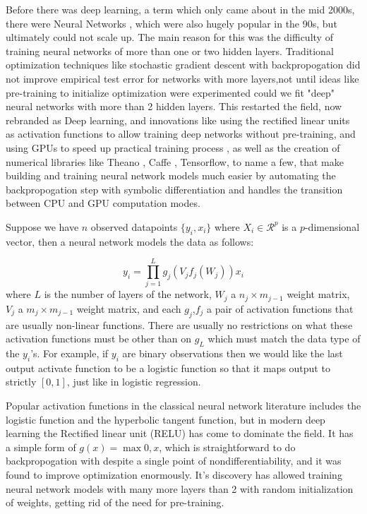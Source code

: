 \documentclass[]{report}
\begin{document}
Before there was deep learning, a term which only came about in the mid 2000s, there were Neural Networks \cite{bishop1995neural,ripley2007pattern}, which were also hugely popular in the 90s, but ultimately could not scale up. The main reason for this was the difficulty of training neural networks of more than one or two hidden layers. Traditional optimization techniques like stochastic gradient descent with backpropogation did not improve empirical test error for networks with more layers,not until ideas like pre-training to initialize optimization were experimented could we fit "deep" neural networks with more than 2 hidden layers. This restarted the field, now rebranded as Deep learning, and innovations like using the rectified linear units as activation functions \cite{nair2010rectified} to allow training deep networks without pre-training, and using GPUs to speed up practical training process \cite{krizhevsky2012imagenet}, as well as the creation of numerical libraries like Theano \cite{bergstra2010theano}, Caffe \cite{jia2014caffe}, Tensorflow\cite{tensorflow2015-whitepaper}, to name a few, that make building and training neural network models much easier by automating the backpropogation step with symbolic differentiation \cite{bahrampour2015comparative} and handles the transition between CPU and GPU computation modes. 

Suppose we have $n$ observed datapoints $\{y_i,x_i\}$ where $X_i \in
\mathcal{R}^p$ is a $p$-dimensional vector, then a neural network models the
data as follows:

\[y_i = \prod_{j=1}^Lg_j(V_jf_j(W_j))x_i \]
where $L$ is the number of layers of the network, $W_j$ a $n_j \times m_{j-1}$
weight matrix, $V_j$ a $m_j \times m_{j-1}$ weight matrix, and each $g_j$,$f_j$
a pair of activation functions that are usually non-linear functions. There are
usually no restrictions on what these activation functions must be other than on
$g_L$ which must match the data type of the $y_i$'s. For example, if $y_i$ are
binary observations then we would like the last output activate function to be a
logistic function so that it maps output to strictly $[0,1]$, just like in
logistic regression.

Popular activation functions in the classical neural network literature includes
the logistic function and the hyperbolic tangent function, but in modern deep
learning the Rectified linear unit (RELU) has come to dominate the field. It has
a simple form of $g(x)=\max{0,x}$, which is straightforward to do
backpropogation with despite a single point of nondifferentiability, and it was
found to improve optimization enormously. It's discovery has allowed training
neural network models with many more layers than 2 with random initialization of
weights, getting rid of the need for pre-training. 
\end{document}
